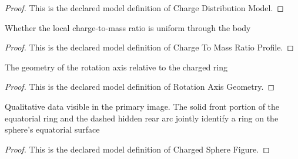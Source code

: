\begin{proof}
  This is the declared model definition of Charge Distribution Model.
\end{proof}
\begin{definition}
  \label{def:physics:phyx-mini-0563:phyxminiproblems-problemphyxmini0563-chargetomassratioprofile}
  Whether the local charge-to-mass ratio is uniform through the body
\end{definition}
\begin{proof}
  This is the declared model definition of Charge To Mass Ratio Profile.
\end{proof}
\begin{definition}
  \label{def:physics:phyx-mini-0563:phyxminiproblems-problemphyxmini0563-rotationaxisgeometry}
  The geometry of the rotation axis relative to the charged ring
\end{definition}
\begin{proof}
  This is the declared model definition of Rotation Axis Geometry.
\end{proof}
\begin{definition}
  \label{def:physics:phyx-mini-0563:phyxminiproblems-problemphyxmini0563-chargedspherefigure}
  Qualitative data visible in the primary image. The solid front portion of the equatorial ring and the dashed hidden rear arc jointly identify a ring on the sphere's equatorial surface
\end{definition}
\begin{proof}
  This is the declared model definition of Charged Sphere Figure.
\end{proof}

